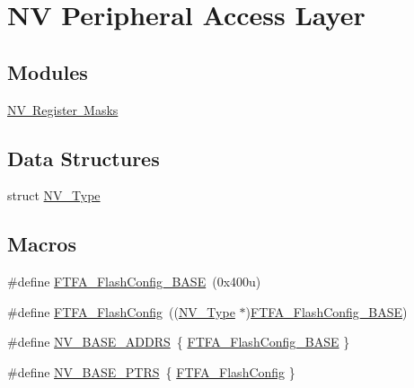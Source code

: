 \hypertarget{group___n_v___peripheral___access___layer}{}\section{NV Peripheral Access Layer}
\label{group___n_v___peripheral___access___layer}
\subsection*{Modules}
\begin{DoxyCompactItemize}
\item 
\mbox{\hyperlink{group___n_v___register___masks}{N\+V Register Masks}}
\end{DoxyCompactItemize}
\subsection*{Data Structures}
\begin{DoxyCompactItemize}
\item 
struct \mbox{\hyperlink{struct_n_v___type}{N\+V\+\_\+\+Type}}
\end{DoxyCompactItemize}
\subsection*{Macros}
\begin{DoxyCompactItemize}
\item 
\#define \mbox{\hyperlink{group___n_v___peripheral___access___layer_ga1e6dbd99b75dd6c501dddbdbc8141ea7}{F\+T\+F\+A\+\_\+\+Flash\+Config\+\_\+\+B\+A\+SE}}~(0x400u)
\item 
\#define \mbox{\hyperlink{group___n_v___peripheral___access___layer_gaf75019f28fbe0be805db316ab76bda45}{F\+T\+F\+A\+\_\+\+Flash\+Config}}~((\mbox{\hyperlink{struct_n_v___type}{N\+V\+\_\+\+Type}} $\ast$)\mbox{\hyperlink{group___n_v___peripheral___access___layer_ga1e6dbd99b75dd6c501dddbdbc8141ea7}{F\+T\+F\+A\+\_\+\+Flash\+Config\+\_\+\+B\+A\+SE}})
\item 
\#define \mbox{\hyperlink{group___n_v___peripheral___access___layer_ga59a94e9ecd6653c2a47bc205a8c0ba4c}{N\+V\+\_\+\+B\+A\+S\+E\+\_\+\+A\+D\+D\+RS}}~\{ \mbox{\hyperlink{group___n_v___peripheral___access___layer_ga1e6dbd99b75dd6c501dddbdbc8141ea7}{F\+T\+F\+A\+\_\+\+Flash\+Config\+\_\+\+B\+A\+SE}} \}
\item 
\#define \mbox{\hyperlink{group___n_v___peripheral___access___layer_ga1e44e66a8945b675dcebb6fbd6bdc85b}{N\+V\+\_\+\+B\+A\+S\+E\+\_\+\+P\+T\+RS}}~\{ \mbox{\hyperlink{group___n_v___peripheral___access___layer_gaf75019f28fbe0be805db316ab76bda45}{F\+T\+F\+A\+\_\+\+Flash\+Config}} \}
\end{DoxyCompactItemize}


